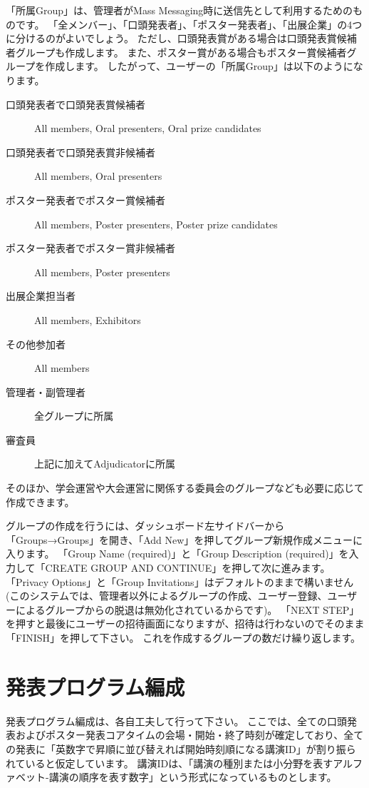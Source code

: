 \documentclass[titlepage,10pt,a4paper,uplatex]{jsbook}
\begin{document}
「所属Group」は、管理者がMass Messaging時に送信先として利用するためのものです。
「全メンバー」、「口頭発表者」、「ポスター発表者」、「出展企業」の4つに分けるのがよいでしょう。
ただし、口頭発表賞がある場合は口頭発表賞候補者グループも作成します。
また、ポスター賞がある場合もポスター賞候補者グループを作成します。
したがって、ユーザーの「所属Group」は以下のようになります。

\begin{description}
\item[口頭発表者で口頭発表賞候補者] All members, Oral presenters, Oral prize candidates
\item[口頭発表者で口頭発表賞非候補者] All members, Oral presenters
\item[ポスター発表者でポスター賞候補者] All members, Poster presenters, Poster prize candidates
\item[ポスター発表者でポスター賞非候補者] All members, Poster presenters
\item[出展企業担当者] All members, Exhibitors
\item[その他参加者] All members
\item[管理者・副管理者] 全グループに所属
\item[審査員] 上記に加えてAdjudicatorに所属
\end{description}

そのほか、学会運営や大会運営に関係する委員会のグループなども必要に応じて作成できます。

グループの作成を行うには、ダッシュボード左サイドバーから「Groups→Groups」を開き、「Add New」を押してグループ新規作成メニューに入ります。
「Group Name (required)」と「Group Description (required)」を入力して「CREATE GROUP AND CONTINUE」を押して次に進みます。
「Privacy Options」と「Group Invitations」はデフォルトのままで構いません(このシステムでは、管理者以外によるグループの作成、ユーザー登録、ユーザーによるグループからの脱退は無効化されているからです)。
「NEXT STEP」を押すと最後にユーザーの招待画面になりますが、招待は行わないのでそのまま「FINISH」を押して下さい。
これを作成するグループの数だけ繰り返します。

\section{発表プログラム編成}

発表プログラム編成は、各自工夫して行って下さい。
ここでは、全ての口頭発表およびポスター発表コアタイムの会場・開始・終了時刻が確定しており、全ての発表に「英数字で昇順に並び替えれば開始時刻順になる講演ID」が割り振られていると仮定しています。
講演IDは、「講演の種別または小分野を表すアルファベット-講演の順序を表す数字」という形式になっているものとします。
\end{document}
